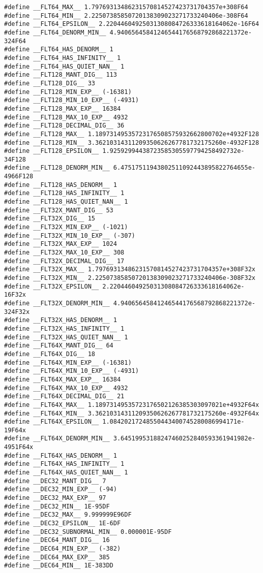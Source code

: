 \documentclass[11pt]{article}
\begin{document}
\begin{verbatim}
#define __FLT64_MAX__ 1.79769313486231570814527423731704357e+308F64
#define __FLT64_MIN__ 2.22507385850720138309023271733240406e-308F64
#define __FLT64_EPSILON__ 2.22044604925031308084726333618164062e-16F64
#define __FLT64_DENORM_MIN__ 4.94065645841246544176568792868221372e-324F64
#define __FLT64_HAS_DENORM__ 1
#define __FLT64_HAS_INFINITY__ 1
#define __FLT64_HAS_QUIET_NAN__ 1
#define __FLT128_MANT_DIG__ 113
#define __FLT128_DIG__ 33
#define __FLT128_MIN_EXP__ (-16381)
#define __FLT128_MIN_10_EXP__ (-4931)
#define __FLT128_MAX_EXP__ 16384
#define __FLT128_MAX_10_EXP__ 4932
#define __FLT128_DECIMAL_DIG__ 36
#define __FLT128_MAX__ 1.18973149535723176508575932662800702e+4932F128
#define __FLT128_MIN__ 3.36210314311209350626267781732175260e-4932F128
#define __FLT128_EPSILON__ 1.92592994438723585305597794258492732e-34F128
#define __FLT128_DENORM_MIN__ 6.47517511943802511092443895822764655e-4966F128
#define __FLT128_HAS_DENORM__ 1
#define __FLT128_HAS_INFINITY__ 1
#define __FLT128_HAS_QUIET_NAN__ 1
#define __FLT32X_MANT_DIG__ 53
#define __FLT32X_DIG__ 15
#define __FLT32X_MIN_EXP__ (-1021)
#define __FLT32X_MIN_10_EXP__ (-307)
#define __FLT32X_MAX_EXP__ 1024
#define __FLT32X_MAX_10_EXP__ 308
#define __FLT32X_DECIMAL_DIG__ 17
#define __FLT32X_MAX__ 1.79769313486231570814527423731704357e+308F32x
#define __FLT32X_MIN__ 2.22507385850720138309023271733240406e-308F32x
#define __FLT32X_EPSILON__ 2.22044604925031308084726333618164062e-16F32x
#define __FLT32X_DENORM_MIN__ 4.94065645841246544176568792868221372e-324F32x
#define __FLT32X_HAS_DENORM__ 1
#define __FLT32X_HAS_INFINITY__ 1
#define __FLT32X_HAS_QUIET_NAN__ 1
#define __FLT64X_MANT_DIG__ 64
#define __FLT64X_DIG__ 18
#define __FLT64X_MIN_EXP__ (-16381)
#define __FLT64X_MIN_10_EXP__ (-4931)
#define __FLT64X_MAX_EXP__ 16384
#define __FLT64X_MAX_10_EXP__ 4932
#define __FLT64X_DECIMAL_DIG__ 21
#define __FLT64X_MAX__ 1.18973149535723176502126385303097021e+4932F64x
#define __FLT64X_MIN__ 3.36210314311209350626267781732175260e-4932F64x
#define __FLT64X_EPSILON__ 1.08420217248550443400745280086994171e-19F64x
#define __FLT64X_DENORM_MIN__ 3.64519953188247460252840593361941982e-4951F64x
#define __FLT64X_HAS_DENORM__ 1
#define __FLT64X_HAS_INFINITY__ 1
#define __FLT64X_HAS_QUIET_NAN__ 1
#define __DEC32_MANT_DIG__ 7
#define __DEC32_MIN_EXP__ (-94)
#define __DEC32_MAX_EXP__ 97
#define __DEC32_MIN__ 1E-95DF
#define __DEC32_MAX__ 9.999999E96DF
#define __DEC32_EPSILON__ 1E-6DF
#define __DEC32_SUBNORMAL_MIN__ 0.000001E-95DF
#define __DEC64_MANT_DIG__ 16
#define __DEC64_MIN_EXP__ (-382)
#define __DEC64_MAX_EXP__ 385
#define __DEC64_MIN__ 1E-383DD

\end{verbatim}
\end{document}

